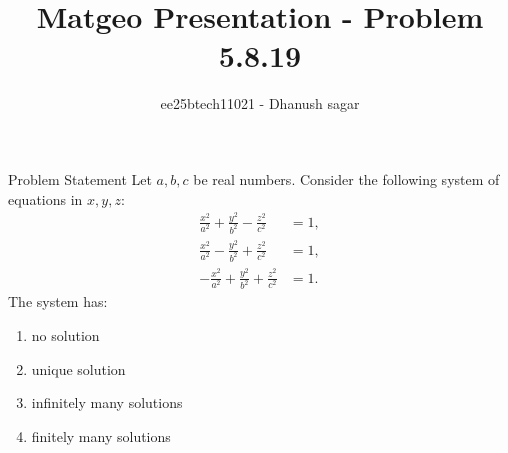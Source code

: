 \documentclass{beamer}
\title{Matgeo Presentation - Problem 5.8.19}
\author{ee25btech11021 - Dhanush sagar}
\numberwithin{equation}{section}
\theoremstyle{remark}
\begin{document}
	

		




\begin{frame}
  \titlepage
\end{frame}

\begin{frame}{Problem Statement}
Let $a, b, c$ be real numbers. Consider the following system of equations in $x, y, z$:
\begin{align*}
\frac{x^2}{a^2} + \frac{y^2}{b^2} - \frac{z^2}{c^2} &= 1, \\
\frac{x^2}{a^2} - \frac{y^2}{b^2} + \frac{z^2}{c^2} &= 1, \\
-\frac{x^2}{a^2} + \frac{y^2}{b^2} + \frac{z^2}{c^2} &= 1.
\end{align*}
The system has:
\begin{enumerate}
    \item no solution
    \item unique solution
    \item infinitely many solutions
    \item finitely many solutions
\end{enumerate}
\end{frame}
\end{document}
